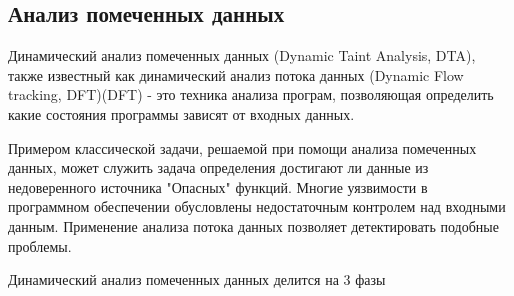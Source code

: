 \begin{itemize}
\subsection{Анализ помеченных данных}

Динамический анализ помеченных данных (Dynamic Taint Analysis, DTA), также известный как динамический анализ потока данных (Dynamic Flow tracking, DFT)(DFT) - это техника анализа програм, позволяющая определить какие состояния программы зависят от входных данных.

Примером классической задачи, решаемой при помощи анализа помеченных данных, может служить задача определения достигают ли данные из недоверенного источника "Опасных" функций. Многие уязвимости в программном обеспечении обусловлены недостаточным контролем над входными данным. Применение анализа потока данных позволяет детектировать подобные проблемы.

Динамический анализ помеченных данных делится на 3 фазы


\end{itemize}
